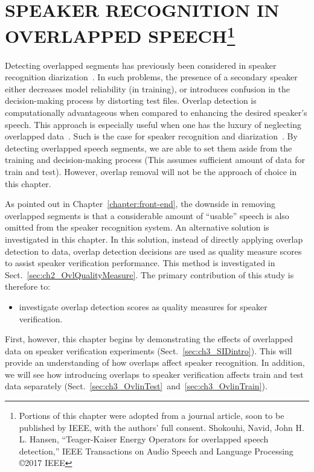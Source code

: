 \chapter{SPEAKER RECOGNITION IN OVERLAPPED SPEECH\thanks{Portions of this chapter were adopted from a journal article, soon to be published by IEEE, with the authors' full consent. Shokouhi, Navid, John H. L. Hansen, ``Teager-Kaiser Energy Operators for overlapped speech detection,'' IEEE Transactions on Audio Speech and Language Processing \copyright 2017 IEEE}}
\label{chapter:ovl_in_sid}
Detecting overlapped segments has previously been considered in speaker recognition diarization~\cite{boakye_thesis,yantorno_report}. 
In such problems, the presence of a secondary speaker either decreases model reliability (in training), or introduces confusion in the decision-making process by distorting test files. 
Overlap detection is computationally advantageous when compared to enhancing the desired speaker's speech. 
This approach is especially useful when one has the luxury of neglecting overlapped data~\cite{yantorno_report}. 
Such is the case for speaker recognition and diarization~\cite{Boakye_is_08}. 
By detecting overlapped speech segments, we are able to set them aside from the training and decision-making process (This assumes sufficient amount of data for train and test). 
However, overlap removal will not be the approach of choice in this chapter. 

As pointed out in Chapter~\ref{chapter:front-end}, the downside in removing overlapped segments is that a considerable amount of ``usable'' speech is also omitted from the speaker recognition system. 
An alternative solution is investigated in this chapter. 
In this solution, instead of directly applying overlap detection to data, overlap detection decisions are used as quality measure scores to assist speaker verification performance. 
This method is investigated in Sect.~\ref{sec:ch2_OvlQualityMeasure}. 
The primary contribution of this study is therefore to:
\begin{itemize}
	\item investigate overlap detection scores as quality measures for speaker verification. 
\end{itemize}
First, however, this chapter begins by demonstrating the effects of overlapped data on speaker verification experiments (Sect.~\ref{sec:ch3_SIDintro}). 
This will provide an understanding of how overlaps affect speaker recognition. 
In addition, we will see how introducing overlaps to speaker verification affects train and test data separately (Sect.~\ref{sec:ch3_OvlinTest}~and~\ref{sec:ch3_OvlinTrain}). 


